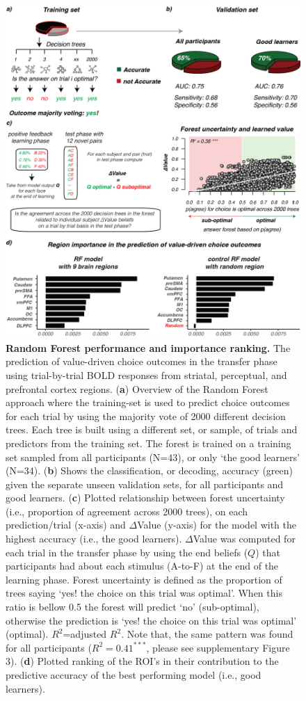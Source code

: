 \documentclass[]{article}
\begin{document}
\begin{figure}
\centering
\includegraphics{_png/Figure6.png}
\caption{\textbf{Random Forest performance and importance ranking.} The
prediction of value-driven choice outcomes in the transfer phase using
trial-by-trial BOLD responses from striatal, perceptual, and prefrontal
cortex regions. (\textbf{a}) Overview of the Random Forest approach
where the training-set is used to predict choice outcomes for each trial
by using the majority vote of 2000 different decision trees. Each tree
is built using a different set, or sample, of trials and predictors from
the training set. The forest is trained on a training set sampled from
all participants (N=43), or only `the good learners' (N=34).
(\textbf{b}) Shows the classification, or decoding, accuracy (green)
given the separate unseen validation sets, for all participants and good
learners. (\textbf{c}) Plotted relationship between forest uncertainty
(i.e., proportion of agreement across 2000 trees), on each
prediction/trial (x-axis) and \(\Delta\)Value (y-axis) for the model
with the highest accuracy (i.e., the good learners). \(\Delta\)Value was
computed for each trial in the transfer phase by using the end beliefs
(\(Q\)) that participants had about each stimulus (A-to-F) at the end of
the learning phase. Forest uncertainty is defined as the proportion of
trees saying `yes! the choice on this trial was optimal'. When this
ratio is bellow 0.5 the forest will predict `no' (sub-optimal),
otherwise the prediction is `yes! the choice on this trial was optimal'
(optimal). \(R^2\)=adjusted \(R^2\). Note that, the same pattern was
found for all participants (\(R^2\)\(=0.41^{***}\), please see
supplementary Figure 3). (\textbf{d}) Plotted ranking of the ROI's in
their contribution to the predictive accuracy of the best performing
model (i.e., good learners). \label{Figure 6}}
\end{figure}
\end{document}
